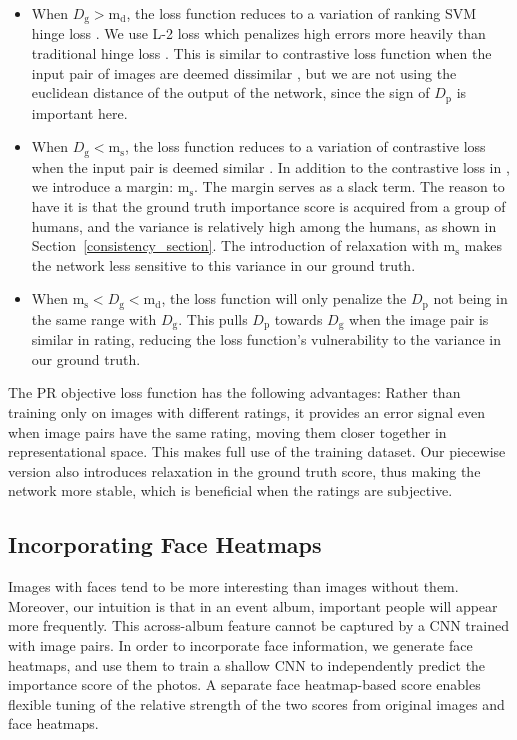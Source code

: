 \documentclass[10pt,twocolumn,letterpaper]{article}
\begin{document}
\begin{itemize}
  \item When $D_\text{g}  > \text{m}_\text{d}$, the loss function reduces to a variation of ranking SVM hinge loss \cite{ranking_loss}. We use L-2 loss which penalizes high errors more heavily than traditional hinge loss \cite{svm}. This is similar to contrastive loss function when the input pair of images are deemed dissimilar \cite{contrastive}, but we are not using the euclidean distance of the output of the network, since the sign of $D_\text{p}$ is important here. 
  \item When $D_\text{g} < \text{m}_\text{s}$, the loss function reduces to a variation of contrastive loss when the input pair is deemed similar \cite{contrastive}. In addition to the contrastive loss in \cite{contrastive}, we introduce a margin: $ \text{m}_\text{s}$. The margin serves as a slack term. The reason to have it is that the ground truth importance score is acquired from a group of humans, and the variance is relatively high among the humans, as shown in Section~\ref{consistency_section}. The introduction of relaxation with $\text{m}_\text{s}$ makes the network less sensitive to this variance in our ground truth.
  \item When $\text{m}_\text{s} < D_\text{g}  < \text{m}_\text{d}$, the loss function will only penalize the $D_\text{p}$ not being in the same range with $D_\text{g}$. This pulls $D_\text{p}$ towards $D_\text{g}$ when the image pair is similar in rating, reducing the loss function's vulnerability to the variance in our ground truth.
\end{itemize}

The PR objective loss function has the following advantages: Rather than training only on images with different ratings, it provides an error signal even when image pairs have the same rating, moving them closer together in representational space.  This makes full use of the training dataset. Our piecewise version also  introduces relaxation in the ground truth score, thus making the network more stable, which is beneficial when the ratings are subjective.

\subsection{Incorporating Face Heatmaps}
Images with faces tend to be more interesting than images without them\cite{sum_pinaki}. Moreover, our intuition is that in an event album, important people will appear more frequently. This across-album feature cannot be captured by a CNN trained with image pairs. In order to incorporate face information, we generate face heatmaps, and use them to train a shallow CNN to independently predict the importance score of the photos. A separate face heatmap-based score enables flexible tuning of the relative strength of the two scores from original images and face heatmaps. 
\end{document}
